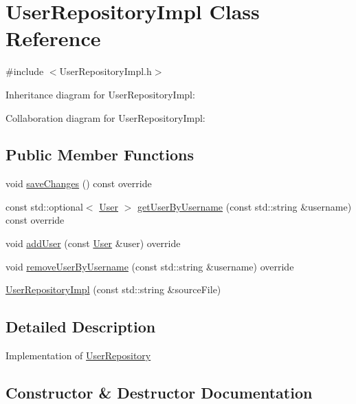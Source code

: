 \hypertarget{classUserRepositoryImpl}{}\section{User\+Repository\+Impl Class Reference}
\label{classUserRepositoryImpl}


{\ttfamily \#include $<$User\+Repository\+Impl.\+h$>$}



Inheritance diagram for User\+Repository\+Impl\+:


Collaboration diagram for User\+Repository\+Impl\+:
\subsection*{Public Member Functions}
\begin{DoxyCompactItemize}
\item 
void \hyperlink{classUserRepositoryImpl_a9a4406e613a882f4f71b9325781264a5}{save\+Changes} () const override
\item 
const std\+::optional$<$ \hyperlink{classUser}{User} $>$ \hyperlink{classUserRepositoryImpl_a4da14e2e63ff2971a81ab980994eb585}{get\+User\+By\+Username} (const std\+::string \&username) const override
\item 
void \hyperlink{classUserRepositoryImpl_a61a12165d5160621002184655ab1a809}{add\+User} (const \hyperlink{classUser}{User} \&user) override
\item 
void \hyperlink{classUserRepositoryImpl_a378218667dea52fcd31a345547b9e7cf}{remove\+User\+By\+Username} (const std\+::string \&username) override
\item 
\hyperlink{classUserRepositoryImpl_a82b801af76fcbfd23d5ddf7f90b4154a}{User\+Repository\+Impl} (const std\+::string \&source\+File)
\end{DoxyCompactItemize}


\subsection{Detailed Description}
Implementation of \hyperlink{classUserRepository}{User\+Repository} 

\subsection{Constructor \& Destructor Documentation}
\mbox{\label{classUserRepositoryImpl_a82b801af76fcbfd23d5ddf7f90b4154a}} 
